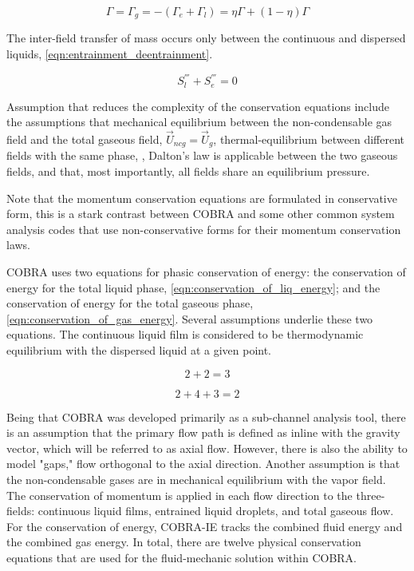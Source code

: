\begin{equation}
\label{eqn:apportionment_of_mass_transfer}
\Gamma = \Gamma_g = -( \Gamma_e + \Gamma_l ) =  \eta \Gamma + (1 - \eta)\Gamma
\end{equation}

The inter-field transfer of mass occurs only between the continuous and dispersed liquids, \eqref{eqn:entrainment_deentrainment}.

\begin{equation}
\label{eqn:entrainment_deentrainment}
S^{'''}_l + S^{'''}_e = 0
\end{equation}

Assumption that reduces the complexity of the conservation equations include the assumptions that mechanical equilibrium between the non-condensable gas field and the total gaseous field, $\vec{U}_{ncg} = \vec{U}_g$, thermal-equilibrium between different fields with the same phase, $ $, Dalton's law is applicable between the two gaseous fields, and that, most importantly, all fields share an equilibrium pressure.

Note that the momentum conservation equations are formulated in conservative form, this is a stark contrast between COBRA and some other common system analysis codes \cite{TRACE, RELAP} that use non-conservative forms for their momentum conservation laws.

COBRA uses two equations for phasic conservation of energy: the conservation of energy for the total liquid phase, \eqref{eqn:conservation_of_liq_energy}; and the conservation of energy for the total gaseous phase, \eqref{eqn:conservation_of_gas_energy}.
Several assumptions underlie these two equations.
The continuous liquid film is considered to be thermodynamic equilibrium with the dispersed liquid at a given point.

\begin{equation}
\label{eqn:conservation_of_liq_energy}
2 + 2 = 3
\end{equation} 

\begin{equation}
\label{eqn:conservation_of_gas_energy}
2 + 4  + 3 = 2
\end{equation}

Being that COBRA was developed primarily as a sub-channel analysis tool, there is an assumption that the primary flow path is defined as inline with the gravity vector, which will be referred to as axial flow.
However, there is also the ability to model "gaps," flow orthogonal to the axial direction.
Another assumption is that the non-condensable gases are in mechanical equilibrium with the vapor field.
The conservation of momentum is applied in each flow direction to the three-fields: continuous liquid films, entrained liquid droplets, and total gaseous flow.
For the conservation of energy, COBRA-IE tracks the combined fluid energy and the combined gas energy.
In total, there are twelve physical conservation equations that are used for the fluid-mechanic solution within COBRA.


